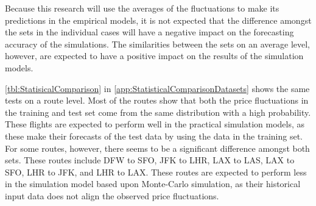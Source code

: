 Because this research will use the averages of the fluctuations to make its predictions in the empirical models, it is not expected that the difference amongst the sets in the individual cases will have a negative impact on the forecasting accuracy of the simulations. The similarities between the sets on an average level, however, are expected to have a positive impact on the results of the simulation models.

\autoref{tbl:StatisicalComparison} in \autoref{app:StatisticalComparisonDatasets} shows the same tests on a route level. Most of the routes show that both the price fluctuations in the training and test set come from the same distribution with a high probability. These flights are expected to perform well in the practical simulation models, as these make their forecasts of the test data by using the data in the training set. For some routes, however, there seems to be a significant difference amongst both sets. These routes include DFW to SFO, JFK to LHR, LAX to LAS, LAX to SFO, LHR to JFK, and LHR to LAX. These routes are expected to perform less in the simulation model based upon Monte-Carlo simulation, as their historical input data does not align the observed price fluctuations.


